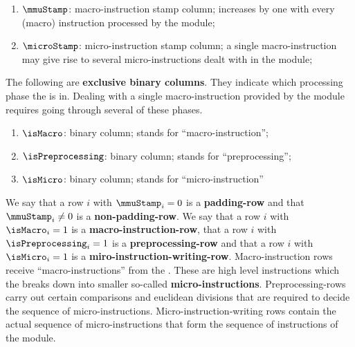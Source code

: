 \begin{enumerate}
	\item $\mmuStamp$:
		macro-instruction stamp column; increases by one with every (macro) instruction processed by the \mmuMod{} module; 
	\item $\microStamp$:
		micro-instruction stamp column; a single macro-instruction may give rise to several micro-instructions dealt with in the \mmioMod{} module;
\end{enumerate}
The following are \textbf{exclusive binary columns}.
They indicate which processing phase the \mmuMod{} is in.
Dealing with a single macro-instruction provided by the \hubMod{} module requires going through several of these phases.
\begin{enumerate}[resume]
	\item $\isMacro$:
		binary column;
		\mmuMacroInstructionSymbol{} stands for ``macro-instruction'';
	\item $\isPreprocessing$:
		binary column;
		\mmuPreprocessingSymbol{} stands for ``preprocessing'';
	\item $\isMicro$:
		binary column;
		\mmuMicroInstructionSymbol{} stands for ``micro-instruction''
\end{enumerate}
We say that a row $i$ with
$\mmuStamp_{i} =    0$ is a \textbf{padding-row} and that 
$\mmuStamp_{i} \neq 0$ is a \textbf{non-padding-row}.
We say that a row $i$ with  $\isMacro_{i} = 1$         is a \textbf{macro-instruction-row},
that a row $i$ with         $\isPreprocessing_{i} = 1$ is a \textbf{preprocessing-row}
and that a row $i$ with     $\isMicro_{i} = 1$         is a \textbf{miro-instruction-writing-row}.
Macro-instruction rows receive ``macro-instructions'' from the \hubMod{}. These are high level instructions which the \mmuMod{} breaks down into smaller so-called \textbf{micro-instructions}.
Preprocessing-rows carry out certain comparisons and euclidean divisions that are required to decide the sequence of micro-instructions.
Micro-instruction-writing rows contain the actual sequence of micro-instructions that form the sequence of instructions of the \mmioMod{} module. 

